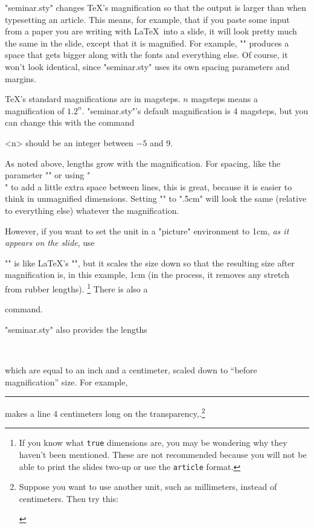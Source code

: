 "seminar.sty" changes \TeX's magnification so that the output is larger than
when typesetting an article. This means, for example, that if you paste some
input from a paper you are writing with \LaTeX\ into a slide, it will look
pretty much the same in the slide, except that it is magnified. For example,
"\vspace{.5in}" produces a space that gets bigger along with the fonts and
everything else. Of course, it won't look identical, since "seminar.sty" uses
its own spacing parameters and margins.

\TeX's standard magnifications are in magsteps. $n$ magsteps means a
magnification of $1.2^n$. "seminar.sty"'s default magnification is 4 magsteps,
but you can change this with the command
\begin{MD}
\end{MD}
<n> should be an integer between $-5$ and 9.

As noted above, lengths grow with the magnification. For spacing, like the
parameter "\parindent" or using "\\[2pt]" to add a little extra space between
lines, this is great, because it is easier to think in unmagnified dimensions.
Setting "\parindent" to ".5cm" will look the same (relative to everything
else) whatever the magnification.

However, if you want to set the unit in a "picture" environment to 1cm, {\em
as it appears on the slide}, use
\begin{LVerbatim}
  \setslidelength{\unitlength}{1cm}
\end{LVerbatim}
"\setslidelength" is like \LaTeX's "\setlength", but it scales the size down
so that the resulting size after magnification is, in this example, 1cm (in
the process, it removes any stretch from rubber lengths).%
\footnote{If you know what {\tt true} dimensions are, you may be wondering why
they haven't been mentioned. These are not recommended because you will not be
able to print the slides two-up or use the {\tt article} format.}
There is also a
\begin{MD}
\end{MD}
command.

"seminar.sty" also provides the lengths
\begin{MD}
  \semin\\
  \semcm
\end{MD}
which are equal to an inch and a centimeter, scaled down to ``before
magnification'' size. For example,
\begin{LVerbatim}
  \rule{1pt}{4\semcm}
\end{LVerbatim}
makes a line 4 centimeters long on the transparency,.\footnote{Suppose you
want to use another unit, such as millimeters, instead of centimeters. Then
try this:
\begin{LVerbatim}
  \newcommand{\semmm}{\semcm}
  \renewcommand{\semcmlength}{1mm}
  \setslidelength{\semmm}{1mm}
\end{LVerbatim}}


